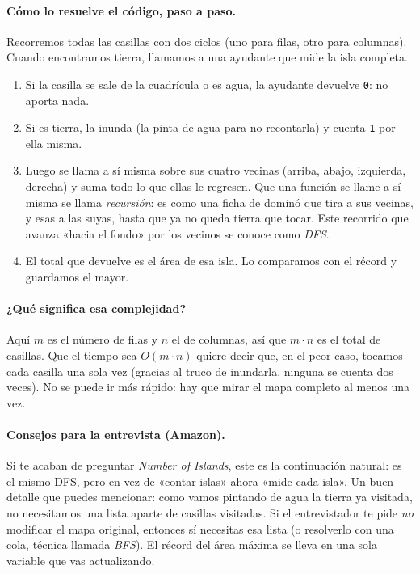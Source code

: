 \paragraph{Cómo lo resuelve el código, paso a paso.} Recorremos todas las
casillas con dos ciclos (uno para filas, otro para columnas). Cuando
encontramos tierra, llamamos a una ayudante que mide la isla completa.
\begin{enumerate}
  \item Si la casilla se sale de la cuadrícula o es agua, la ayudante devuelve
        \texttt{0}: no aporta nada.
  \item Si es tierra, la inunda (la pinta de agua para no recontarla) y cuenta
        \texttt{1} por ella misma.
  \item Luego se llama a sí misma sobre sus cuatro vecinas (arriba, abajo,
        izquierda, derecha) y suma todo lo que ellas le regresen. Que una
        función se llame a sí misma se llama \emph{recursión}: es como una
        ficha de dominó que tira a sus vecinas, y esas a las suyas, hasta que
        ya no queda tierra que tocar. Este recorrido que avanza «hacia el
        fondo» por los vecinos se conoce como \emph{DFS}.
  \item El total que devuelve es el área de esa isla. Lo comparamos con el
        récord y guardamos el mayor.
\end{enumerate}




\paragraph{¿Qué significa esa complejidad?} Aquí $m$ es el número de filas y
$n$ el de columnas, así que $m\cdot n$ es el total de casillas. Que el tiempo
sea $O(m\cdot n)$ quiere decir que, en el peor caso, tocamos cada casilla una
sola vez (gracias al truco de inundarla, ninguna se cuenta dos veces). No se
puede ir más rápido: hay que mirar el mapa completo al menos una vez.

\paragraph{Consejos para la entrevista (Amazon).} Si te acaban de preguntar
\emph{Number of Islands}, este es la continuación natural: es el mismo DFS, pero
en vez de «contar islas» ahora «mide cada isla». Un buen detalle que puedes
mencionar: como vamos pintando de agua la tierra ya visitada, no necesitamos
una lista aparte de casillas visitadas. Si el entrevistador te pide \emph{no}
modificar el mapa original, entonces sí necesitas esa lista (o resolverlo con
una cola, técnica llamada \emph{BFS}). El récord del área máxima
se lleva en una sola
variable que vas actualizando.
